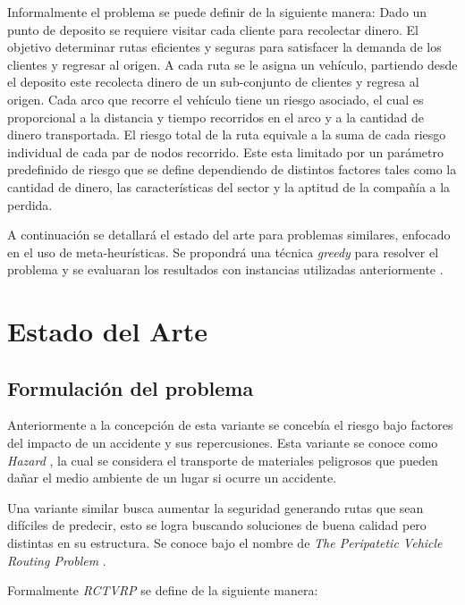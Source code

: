 \documentclass[conference]{IEEEtran}
\begin{document}
Informalmente el problema se puede definir de la siguiente manera: Dado un punto de deposito se requiere visitar cada cliente para recolectar dinero. El objetivo determinar rutas eficientes y seguras para satisfacer la demanda de los clientes y regresar al origen. A cada ruta se le asigna un vehículo, partiendo desde el deposito este recolecta dinero de un sub-conjunto de clientes y regresa al origen. Cada arco que recorre el vehículo tiene un riesgo asociado, el cual es proporcional a la distancia y tiempo recorridos en el arco y a la cantidad de dinero transportada. El riesgo total de la ruta equivale a la suma de cada riesgo individual de cada par de nodos recorrido. Este esta limitado por un parámetro predefinido de riesgo que se define dependiendo de distintos factores tales como la cantidad de dinero, las características del sector y la aptitud de la compañía a la perdida. 

A continuación se detallará el estado del arte para problemas similares, enfocado en el uso de meta-heurísticas. Se propondrá una técnica \textit{greedy} para resolver el problema y se evaluaran los resultados con instancias utilizadas anteriormente \cite{TALARICO2015457}\cite{TALARICO2017547}\cite{RADOJICIC2018486}.


\section{Estado del Arte}

\subsection{Formulación del problema}

Anteriormente a la concepción de esta variante se concebía el riesgo bajo factores del impacto de un accidente y sus repercusiones. Esta variante se conoce como \textit{Hazard} \cite{pijawka1985risk} \cite{hazard1}, la cual se considera el transporte de materiales peligrosos que pueden dañar el medio ambiente de un lugar si ocurre un accidente.

Una variante similar busca aumentar la seguridad generando rutas que sean difíciles de predecir, esto se logra buscando soluciones de buena calidad pero distintas en su estructura. Se conoce bajo el nombre de \textit{The Peripatetic Vehicle Routing Problem} \cite{ppp2}\cite{pppp}.


Formalmente \textit{RCTVRP} se define de la siguiente manera:
\end{document}
